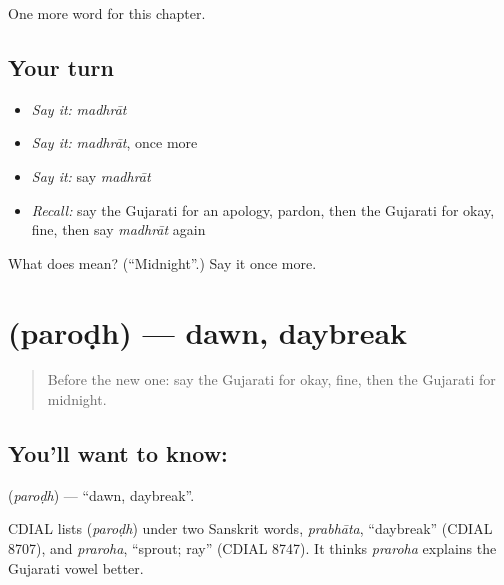 \begin{grammarlens}[title={What you've built}]
One more word for this chapter.
\end{grammarlens}

\subsection*{Your turn}
\begin{itemize}
\raggedright
  \item \emph{Say it:} \emph{madhrāt}
  \item \emph{Say it:} \emph{madhrāt}, once more
  \item \emph{Say it:} say \emph{madhrāt}
  \item \emph{Recall:} say the Gujarati for an apology, pardon, then the Gujarati for okay, fine, then say \emph{madhrāt} again
\end{itemize}

\begin{tcolorbox}[breakable,colback=teal!4,colframe=teal!35!black,title={Before you move on}]
What does  mean? (\textquotedblleft{}Midnight\textquotedblright{}.) Say it once more.
\end{tcolorbox}
\section[\texorpdfstring{\gu{પરોઢ} (paroḍh)}{પરોઢ (paroḍh)}]{ (paroḍh) — dawn, daybreak}

\label{lesson:GU-C92-parodh}



\begin{quote}
Before the new one: say the Gujarati for okay, fine, then the Gujarati for midnight.
\end{quote}

\subsection*{You'll want to know: }
\textbf{} (\emph{paroḍh}) — \textquotedblleft{}dawn, daybreak\textquotedblright{}.

\begin{cousinweb}
CDIAL lists \textbf{} (\emph{paroḍh}) under two Sanskrit words, \emph{prabhāta}, \textquotedblleft{}daybreak\textquotedblright{} (CDIAL 8707), and \emph{praroha}, \textquotedblleft{}sprout; ray\textquotedblright{} (CDIAL 8747). It thinks \emph{praroha} explains the Gujarati vowel better.
\end{cousinweb}

